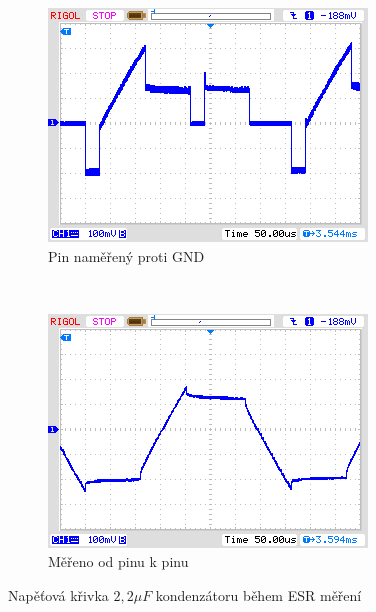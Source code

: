 \begin{figure}[H]
  \begin{subfigure}[b]{.5\textwidth}
    \centering
    \includegraphics[width=1.\textwidth]{../PNG/ESR_2uF_pin2GND.png}
    \caption{Pin naměřený proti GND}
  \end{subfigure}
  ~
  \begin{subfigure}[b]{.5\textwidth}
    \centering
    \includegraphics[width=1.\textwidth]{../PNG/ESR_2uF_pin2pin.png}
    \caption{Měřeno od pinu k pinu}
  \end{subfigure}
  \caption{Napěťová křivka \(2,2\mu F\)  kondenzátoru během ESR měření}
  \label{pic:esr2}
\end{figure}

